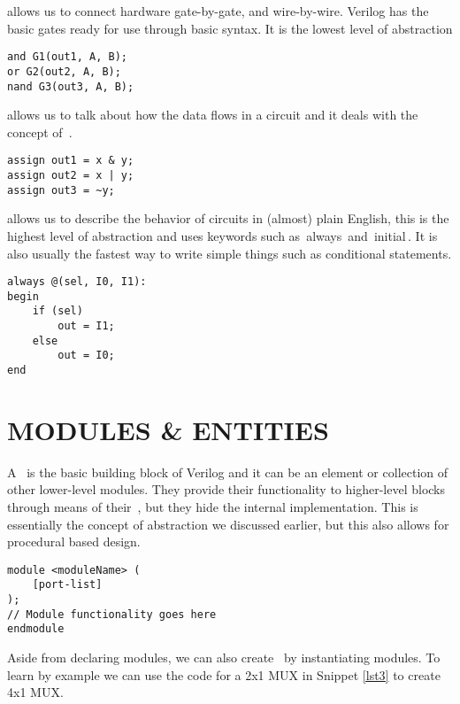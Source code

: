 \documentclass[]{report}
\newcommand{\keyword}[1]{{{\color{green}{#1}\,}}}
\newcommand{\code}[1]{{\ttfamily\color{blue!55!green}\,{#1}\,}}
\renewcommand{\emph}[1]{} %
\begin{document}
\emph{Gate Level Modeling} allows us to connect hardware gate-by-gate, and wire-by-wire. Verilog has the basic gates ready for use through basic syntax. It is the lowest level of abstraction

\begin{lstlisting}[caption={Basic Gate Level Modeling},label={lst1}]
and G1(out1, A, B);
or G2(out2, A, B);
nand G3(out3, A, B);
\end{lstlisting}

\emph{Register Transfer Level Modeling} allows us to talk about how the data flows in a circuit and it deals with the concept of \keyword{continuous assignment}.

\begin{lstlisting}[caption={Basic RTL Modeling}, label={lst2}]
assign out1 = x & y;
assign out2 = x | y;
assign out3 = ~y;
\end{lstlisting}

\emph{Behavioral Modeling} allows us to describe the behavior of circuits in (almost) plain English, this is the highest level of abstraction and uses keywords such as \code{always} and \code{initial}. It is also usually the fastest way to write simple things such as conditional statements.

\begin{lstlisting}[caption={Basic Behavioral Modeling}, label={lst3}]
always @(sel, I0, I1):
begin
	if (sel)
		out = I1;
	else
		out = I0;
end
\end{lstlisting}

\section{MODULES \& ENTITIES}

A \keyword{module} is the basic building block of Verilog and it can be an element or collection of other lower-level modules. They provide their functionality to higher-level blocks through means of their \keyword{ports}, but they hide the internal implementation. This is essentially the concept of abstraction we discussed earlier, but this also allows for procedural based design. 

\begin{lstlisting}[caption={Module Declaration Syntax}, label={lst4}]
module <moduleName> (
	[port-list]
);
// Module functionality goes here
endmodule
\end{lstlisting}

Aside from declaring modules, we can also create \keyword{entities} by instantiating modules. To learn by example we can use the code for a 2x1 MUX in Snippet \ref{lst3} to create  4x1 MUX.
\end{document}
